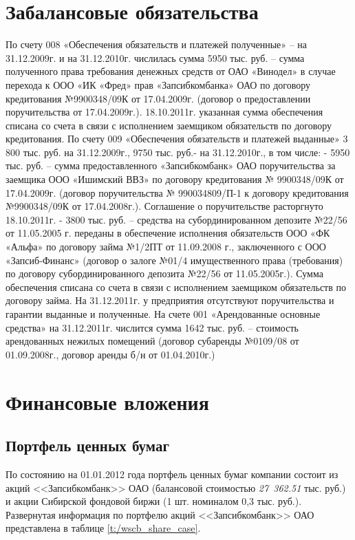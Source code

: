 \documentclass[a4paper,12pt]{scrreprt}
\begin{document}
\normalsize
\rm

\chapter{Забалансовые обязательства} 


По счету 008 «Обеспечения обязательств и платежей полученные» –  на 31.12.2009г. и на 31.12.2010г. числилась сумма 5950 тыс. руб. –  сумма полученного права требования денежных средств от ОАО «Винодел» в случае перехода к ООО «ИК «Фред» прав «Запсибкомбанка» ОАО по договору кредитования №9900348/09К от 17.04.2009г. (договор о предоставлении поручительства от 17.04.2009г.). 18.10.2011г. указанная сумма обеспечения списана со счета в связи с исполнением заемщиком обязательств по договору кредитования. 
По счету 009 «Обеспечения обязательств и платежей выданные» 3 800 тыс. руб. на 31.12.2009г.,  9750 тыс. руб.- на 31.12.2010г.,  в том числе:
- 5950 тыс. руб. – сумма предоставленного «Запсибкомбанк» ОАО поручительства за заемщика ООО «Ишимский ВВЗ» по договору кредитования  № 9900348/09К от 17.04.2009г. (договор  поручительства № 990034809/П-1 к договору кредитования №9900348/09К от 17.04.2008г.). Соглашение о поручительстве расторгнуто 18.10.2011г.
- 3800 тыс. руб. – средства на субординированном депозите №22/56 от 11.05.2005 г. переданы в обеспечение исполнения обязательств ООО «ФК «Альфа» по договору займа №1/2ПТ от 11.09.2008 г., заключенного с ООО «Запсиб-Финанс» (договор о залоге №01/4 имущественного права (требования) по договору субординированного депозита №22/56 от 11.05.2005г.). Сумма обеспечения списана со счета в связи с исполнением заемщиком обязательств по договору займа.
На 31.12.2011г. у предприятия отсутствуют поручительства и гарантии выданные и полученные.
На счете 001 «Арендованные основные средства» на 31.12.2011г. числится сумма 1642 тыс. руб. – стоимость арендованных нежилых помещений (договор субаренды №0109/08 от 01.09.2008г., договор аренды б/н от 01.04.2010г.)



\chapter{Финансовые вложения}

\section{Портфель ценных бумаг}

По состоянию на 01.01.2012 года портфель ценных бумаг компании состоит из акций <<Запсибкомбанк>> ОАО (балансовой стоимостью \emph{27~362.51 } тыс. руб.) и акции Сибирской фондовой биржи (1 шт. номиналом 0,3 тыс. руб.). Развернутая информация по портфелю акций <<Запсибкомбанк>> ОАО представлена в таблице \ref{t:/wscb_share_case}.
\end{document}
